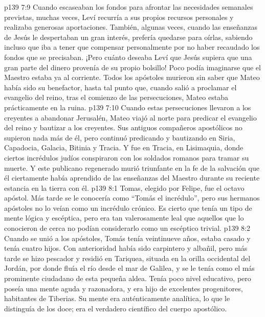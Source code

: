 \vs p139 7:9 Cuando escaseaban los fondos para afrontar las necesidades semanales previstas, muchas veces, Leví recurría a sus propios recursos personales y realizaba generosas aportaciones. También, algunas veces, cuando las enseñanzas de Jesús le despertaban un gran interés, prefería quedarse para oírlas, sabiendo incluso que iba a tener que compensar personalmente por no haber recaudado los fondos que se precisaban. ¡Pero cuánto deseaba Leví que Jesús supiera que una gran parte del dinero provenía de su propio bolsillo! Poco podía imaginarse que el Maestro estaba ya al corriente. Todos los apóstoles murieron sin saber que Mateo había sido su benefactor, hasta tal punto que, cuando salió a proclamar el evangelio del reino, tras el comienzo de las persecuciones, Mateo estaba prácticamente en la ruina.
\vs p139 7:10 \pc Cuando estas persecuciones llevaron a los creyentes a abandonar Jerusalén, Mateo viajó al norte para predicar el evangelio del reino y bautizar a los creyentes. Sus antiguos compañeros apostólicos no supieron nada más de él, pero continuó predicando y bautizando en Siria, Capadocia, Galacia, Bitinia y Tracia. Y fue en Tracia, en Lisimaquia, donde ciertos incrédulos judíos conspiraron con los soldados romanos para tramar su muerte. Y este publicano regenerado murió triunfante en la fe de la salvación que él ciertamente había aprendido de las enseñanzas del Maestro durante su reciente estancia en la tierra con él.
\vs p139 8:1 Tomas, elegido por Felipe, fue el octavo apóstol. Más tarde se le conocería como “Tomás el incrédulo”, pero sus hermanos apóstoles no lo veían como un incrédulo crónico. Es cierto que tenía un tipo de mente lógica y escéptica, pero era tan valerosamente leal que aquellos que lo conocieron de cerca no podían considerarlo como un escéptico trivial.
\vs p139 8:2 Cuando se unió a los apóstoles, Tomás tenía veintinueve años, estaba casado y tenía cuatro hijos. Con anterioridad había sido carpintero y albañil, pero más tarde se hizo pescador y residió en Tariquea, situada en la orilla occidental del Jordán, por donde fluía el río desde el mar de Galilea, y se le tenía como el más prominente ciudadano de esta pequeña aldea. Tenía poco nivel educativo, pero poseía una mente aguda y razonadora, y era hijo de excelentes progenitores, habitantes de Tiberias. Su mente era auténticamente analítica, lo que le distinguía de los doce; era el verdadero científico del cuerpo apostólico.
